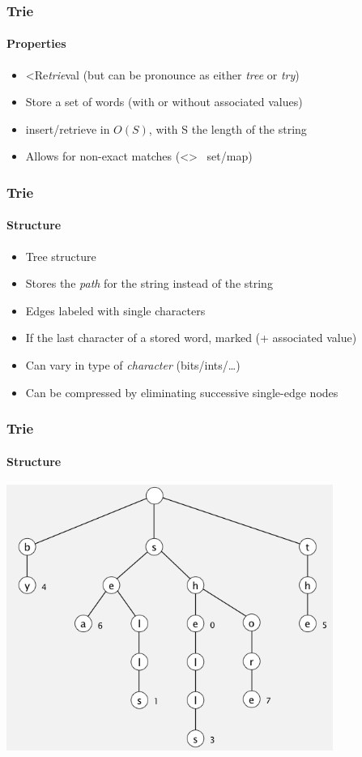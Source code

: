 \frame
{
    \frametitle{Trie}
    \framesubtitle{Properties}
    \begin{itemize}[<+->]
        \item \textless Re\emph{trie}val (but can be pronounce as either \emph{tree} or \emph{try})
        \item Store a set of words (with or without associated values)
        \item insert/retrieve in $ O(S) $, with S the length of the string
        \item Allows for non-exact matches (\textless\textgreater ~ set/map)
    \end{itemize}
}

\frame
{
    \frametitle{Trie}
    \framesubtitle{Structure}

    \begin{itemize}[<+->]
        \item Tree structure
        \item Stores the \emph{path} for the string instead of the string
        \item Edges labeled with single characters
        \item If the last character of a stored word, marked (+ associated value)
        \item Can vary in type of \emph{character} (bits/ints/\dots)
        \item Can be compressed by eliminating successive single-edge nodes
    \end{itemize}
}

\frame
{
    \frametitle{Trie}
    \framesubtitle{Structure}

    \includegraphics[width=0.8\textwidth]{img/trie.png}
}

